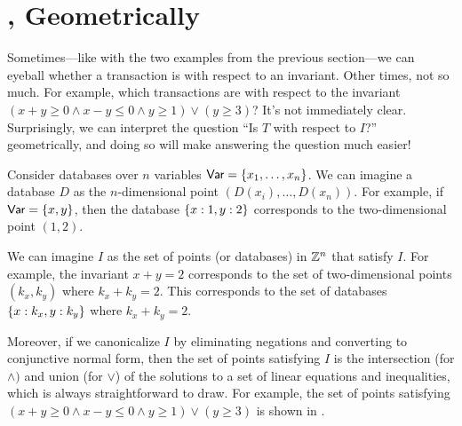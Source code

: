 \section{\iconfluence{}, Geometrically}\label{sec:geometry}
\newcommand{\inva}{x + y \geq 0}
\newcommand{\invb}{x - y \leq 0}
\newcommand{\invc}{y \geq 1}
\newcommand{\invd}{y \geq 3}
\newcommand{\inv}{(\inva \land \invb \land \invc) \lor (\invd)}

Sometimes---like with the two examples from the previous section---we can
eyeball whether a transaction is \iconfluent{} with respect to an invariant.
Other times, not so much. For example, which transactions are \iconfluent{}
with respect to the invariant $\inv$? It's not immediately clear.
Surprisingly, we can interpret the question ``Is $T$ \iconfluent{} with respect
to $I$?'' geometrically, and doing so will make answering the question much
easier!

Consider databases over $n$ variables $\textsf{Var} = \left\{x_1, \ldots, x_n\right\}$. We can
imagine a database $D$ as the $n$-dimensional point $(D(x_i), \ldots, D(x_n))$.
For example, if $\textsf{Var} = \left\{x, y\right\}$, then the database $\left\{x:1, y:2\right\}$
corresponds to the two-dimensional point $(1, 2)$.

We can imagine $I$ as the set of points (or databases) in $\mathbb{Z}^n$ that
satisfy $I$. For example, the invariant $x + y = 2$ corresponds to the set of
two-dimensional points $(k_x, k_y)$ where $k_x + k_y = 2$. This corresponds to
the set of databases $\left\{x:k_x, y:k_y\right\}$ where $k_x + k_y = 2$.

Moreover, if we canonicalize $I$ by eliminating negations and converting to
conjunctive normal form, then the set of points satisfying $I$ is the
intersection (for $\land)$ and union (for $\lor$) of the solutions to a set of
linear equations and inequalities, which is always straightforward to draw. For
example, the set of points satisfying $\inv$ is shown in
.

